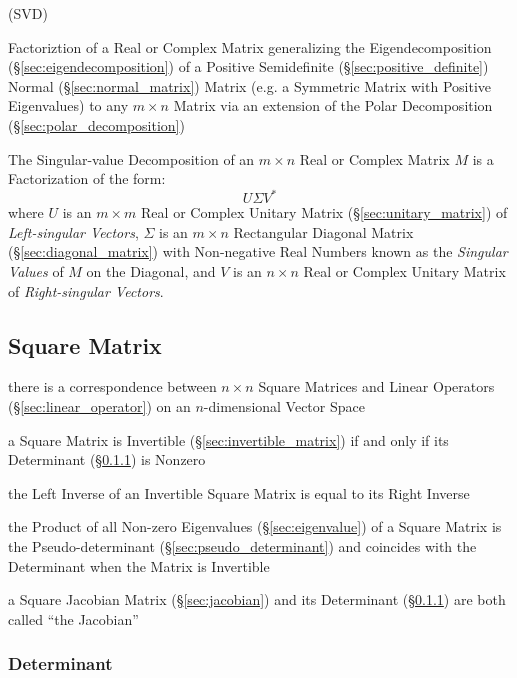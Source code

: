 (SVD)

Factoriztion of a Real or Complex Matrix generalizing the Eigendecomposition
(\S\ref{sec:eigendecomposition}) of a Positive Semidefinite
(\S\ref{sec:positive_definite}) Normal (\S\ref{sec:normal_matrix}) Matrix (e.g.
a Symmetric Matrix with Positive Eigenvalues) to any $m \times n$ Matrix via an
extension of the Polar Decomposition (\S\ref{sec:polar_decomposition})

The Singular-value Decomposition of an $m \times n$ Real or Complex Matrix $M$
is a Factorization of the form:
\[
  U \Sigma V^*
\]
where $U$ is an $m \times m$ Real or Complex Unitary Matrix
(\S\ref{sec:unitary_matrix}) of \emph{Left-singular Vectors}, $\Sigma$ is an $m
\times n$ Rectangular Diagonal Matrix (\S\ref{sec:diagonal_matrix}) with
Non-negative Real Numbers known as the \emph{Singular Values} of $M$ on the
Diagonal, and $V$ is an $n \times n$ Real or Complex Unitary Matrix of
\emph{Right-singular Vectors}.



\subsection{Square Matrix}\label{sec:square_matrix}

there is a correspondence between $n\times{n}$ Square Matrices and Linear
Operators (\S\ref{sec:linear_operator}) on an $n$-dimensional Vector Space

a Square Matrix is Invertible (\S\ref{sec:invertible_matrix}) if and only if
its Determinant (\S\ref{sec:determinant}) is Nonzero

the Left Inverse of an Invertible Square Matrix is equal to its Right Inverse

the Product of all Non-zero Eigenvalues (\S\ref{sec:eigenvalue}) of a Square
Matrix is the Pseudo-determinant (\S\ref{sec:pseudo_determinant}) and coincides
with the Determinant when the Matrix is Invertible

a Square Jacobian Matrix (\S\ref{sec:jacobian}) and its Determinant
(\S\ref{sec:determinant}) are both called ``the Jacobian''



\subsubsection{Determinant}\label{sec:determinant}

